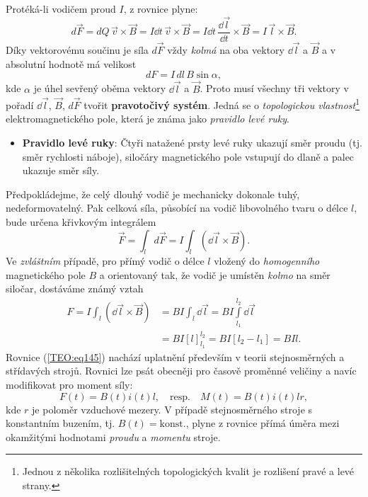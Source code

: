       Protéká-li vodičem proud \(I\), z rovnice plyne:
      \begin{equation*}
        d\vec{F} =  dQ\,\vec{v}\times\vec{B} 
                 = I\dd{t}\,\vec{v}\times\vec{B} 
                 = I\dd{t}\,\frac{\dd{\vec{l}}}{\dd{t}}\times\vec{B}
                 = I\,\vec{l}\times\vec{B}.
      \end{equation*}
      Díky vektorovému součinu je síla \(d\vec{F}\) vždy \emph{kolmá} na oba vektory \(\dd{\vec{l}}\) a 
      \(\vec{B}\) a v absolutní hodnotě má velikost
      \begin{equation*}
              dF=I\,dl\,B\sin\alpha,
      \end{equation*}
      kde \(\alpha\) je úhel sevřený oběma vektory \(\dd{\vec{l}}\) a \(\vec{B}\). Proto musí všechny 
      tři vektory v pořadí \(\dd{\vec{l}}\), \(\vec{B}\), \(d\vec{F}\) tvořit \textbf{pravotočivý 
      systém}. Jedná se o \emph{topologickou vlastnost}\footnote{Jednou z několika rozlišitelných 
      topologických kvalit je rozlišení pravé a levé strany.} elektromagnetického pole, která je 
      známa jako \emph{pravidlo levé ruky}.
      \begin{itemize}
        \item \textbf{Pravidlo levé ruky}: Čtyři natažené prsty levé ruky ukazují směr proudu (tj. 
              směr rychlosti náboje), siločáry magnetického pole vstupují do dlaně a palec ukazuje 
              směr síly.
      \end{itemize}

      Předpokládejme, že celý dlouhý vodič je mechanicky dokonale tuhý, nedeformovatelný. Pak 
      celková síla, působící na vodič libovolného tvaru o délce \(l\), bude určena křivkovým 
      integrálem
      \begin{equation*}
        \vec{F} = \int_ld\vec{F} 
                = I\int_l (\dd{\vec{l}}\times\vec{B}).
      \end{equation*}
      Ve \emph{zvláštním} případě, pro přímý vodič o délce \(l\) vložený do \emph{homogenního} 
      magnetického pole \(B\) a orientovaný tak, že vodič je umístěn \emph{kolmo} na směr siločar, 
      dostáváme známý vztah
      \begin{align}\label{TEO:eq145}
        F  =  I\int_l (\dd{\vec{l}}\times\vec{B})
          &= BI\int_l \dd{\vec{l}} = BI\int\limits_{l_1}^{l_2}\dd{\vec{l}}  \nonumber \\
          &= BI[l]_{l_1}^{l_2}
           = BI[l_2 - l_1]
           = BIl.
      \end{align}
      Rovnice (\ref{TEO:eq145}) nachází uplatnění především v teorii stejnosměrných a 
      střídavých strojů. Rovnici lze psát obecněji pro časově proměnné veličiny a navíc modifikovat 
      pro moment síly:
      \begin{equation*}
        F(t)=B(t)i(t)l, \quad\text{resp.} \quad M(t)=B(t)i(t)lr,
      \end{equation*}
      kde \(r\) je poloměr vzduchové mezery. V případě stejnosměrného stroje s konstantním buzením, 
      tj. \(B(t) = \text{konst.}\), plyne z rovnice přímá úměra mezi okamžitými hodnotami 
      \emph{proudu} a \emph{momentu} stroje.


